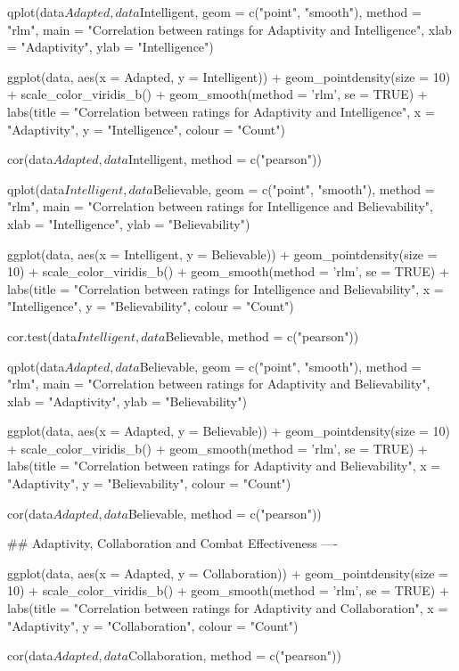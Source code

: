 \documentclass{IEEEtran}
\begin{document}
\begin{verbnobox}[\fontsize{10pt}{10pt}\selectfont]
qplot(data$Adapted, data$Intelligent, geom = c("point", "smooth"), method = "rlm",
      main = "Correlation between ratings for Adaptivity and Intelligence", 
      xlab = "Adaptivity", ylab = "Intelligence")

ggplot(data, aes(x = Adapted, y = Intelligent)) +
  geom_pointdensity(size = 10) +
  scale_color_viridis_b() + 
  geom_smooth(method = 'rlm', se = TRUE) +
  labs(title = "Correlation between ratings for Adaptivity and Intelligence",
       x = "Adaptivity", y = "Intelligence", colour = "Count")

cor(data$Adapted, data$Intelligent, method = c("pearson"))

qplot(data$Intelligent, data$Believable, geom = c("point", "smooth"), method = "rlm",
      main = "Correlation between ratings for Intelligence and Believability", 
      xlab = "Intelligence", ylab = "Believability")

ggplot(data, aes(x = Intelligent, y = Believable)) +
  geom_pointdensity(size = 10) +
  scale_color_viridis_b() + 
  geom_smooth(method = 'rlm', se = TRUE) +
  labs(title = "Correlation between ratings for Intelligence and Believability",
       x = "Intelligence", y = "Believability", colour = "Count")

cor.test(data$Intelligent, data$Believable, method = c("pearson"))

qplot(data$Adapted, data$Believable, geom = c("point", "smooth"), method = "rlm",
      main = "Correlation between ratings for Adaptivity and Believability", 
      xlab = "Adaptivity", ylab = "Believability")

ggplot(data, aes(x = Adapted, y = Believable)) +
  geom_pointdensity(size = 10) +
  scale_color_viridis_b() + 
  geom_smooth(method = 'rlm', se = TRUE) +
  labs(title = "Correlation between ratings for Adaptivity and Believability",
       x = "Adaptivity", y = "Believability", colour = "Count")

cor(data$Adapted, data$Believable, method = c("pearson"))

## Adaptivity, Collaboration and Combat Effectiveness ----

ggplot(data, aes(x = Adapted, y = Collaboration)) +
  geom_pointdensity(size = 10) +
  scale_color_viridis_b() + 
  geom_smooth(method = 'rlm', se = TRUE) +
  labs(title = "Correlation between ratings for Adaptivity and Collaboration",
       x = "Adaptivity", y = "Collaboration", colour = "Count")

cor(data$Adapted, data$Collaboration, method = c("pearson"))


\end{verbnobox}
\end{document}
